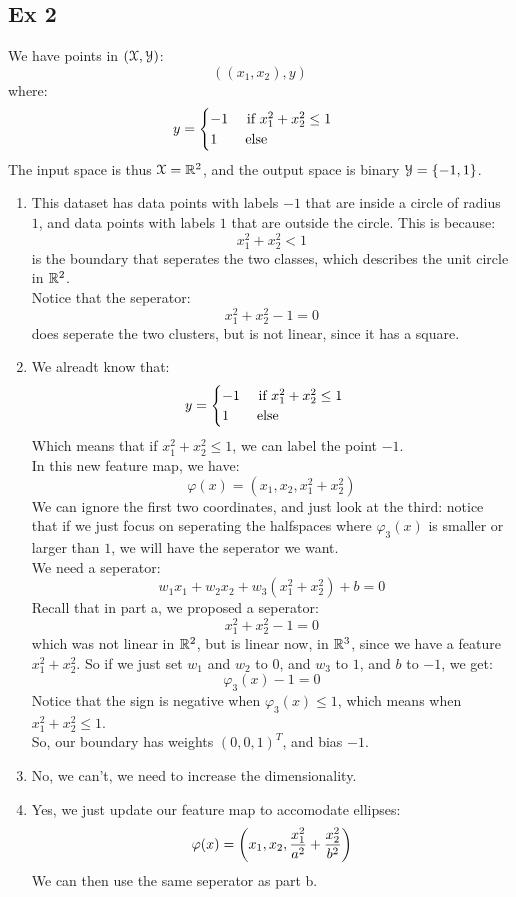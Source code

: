 \documentclass[12pt]{article}
\begin{document}
\newpage

\subsection*{Ex 2}

We have points in $(\mathcal{X}, \mathcal{Y})$:
\[ ((x_1, x_2), y) \]
where:
\[ y = \begin{cases}  -1 \quad 
\text{ if } x_1^2 + x_2^2 \leq 1 \\ 1 \qquad \text{else} \end{cases} \]
The input space is thus $\mathcal{X} = \mathbb{R}^2$,
and the output space is binary $\mathcal{Y} = \{-1, 1\}$. \\
\begin{enumerate}[label = \letters]
\item 
    This dataset has data points with labels
    $-1$ that are inside a circle of radius $1$,
    and data points with labels $1$
    that are outside the circle.
    This is because:
    \[ x_1^2 + x_2^2 < 1 \]
    is the boundary that seperates the two classes,
    which describes the unit circle in $\mathbb{R}^2$. \\
    Notice that the seperator:
    \[ x_1^2 + x_2^2 - 1 = 0 \]
    does seperate the two clusters,
    but is not linear, since it has a square. \\
\item 
    We alreadt know that:
    \[ y = \begin{cases}  -1 \quad 
    \text{ if } x_1^2 + x_2^2 \leq 1 \\ 1 \qquad \text{else} \end{cases} \]
    Which means that if $x_1^2 + x_2^2 \leq 1$,
    we can label the point $-1$. \\
    In this new feature map, we have:
    \[ \varphi(x) = (x_1, x_2, x_1^2 + x_2^2) \]
    We can ignore the first two coordinates,
    and just look at the third: notice
    that if we just focus on seperating
    the halfspaces where $\varphi_3(x)$
    is smaller or larger than $1$,
    we will have the seperator we want. \\
    We need a seperator:
    \[ w_1x_1 + w_2x_2 + w_3(x_1^2 + x_2^2) + b = 0 \]
    Recall that in part a, we proposed a seperator:
    \[ x_1^2 + x_2^2 - 1 = 0 \]
    which was not linear in $\mathbb{R}^2$,
    but is linear now, in $\mathbb{R}^3$,
    since we have a feature $x_1^2 + x_2^2$.
    So if we just set $w_1$ and $w_2$ to $0$,
    and $w_3$ to $1$, and $b$ to $-1$, we get:
    \[ \varphi_3(x) - 1 = 0 \]
    Notice that the sign is negative when
    $\varphi_3(x) \leq 1$,
    which means when $x_1^2 + x_2^2 \leq 1$. \\
    So, our boundary has weights $(0, 0, 1)^T$,
    and bias $-1$. \\
\item 
    No, we can't, we need to increase the
    dimensionality.
\item 
    Yes, we just update our feature map
    to accomodate ellipses:
    \[ \varphi(x) = \left( x_1, x_2, 
    \dfrac{x_1^2}{a^2} + \dfrac{x_2^2}{b^2} \right) \]
    We can then use the same seperator as
    part b.
\end{enumerate}
\end{document}
